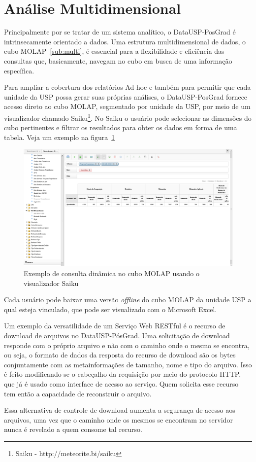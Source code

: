 \section{Análise Multidimensional}
\label{sec:amult}
Principalmente por se tratar de um sistema analítico, o DataUSP-PosGrad é intrinsecamente orientado a dados. Uma estrutura multidimensional de dados, o cubo MOLAP~\ref{sub:multi}, é essencial para a flexibilidade e eficiência das consultas que, basicamente, navegam no cubo em busca de uma informação específica.
\par
Para ampliar a cobertura dos relatórios Ad-hoc e também para permitir que cada unidade da USP possa gerar suas próprias análises, o DataUSP-PosGrad fornece acesso direto ao cubo MOLAP, segmentado por unidade da USP, por meio de um visualizador chamado Saiku\footnote{Saiku - http://meteorite.bi/saiku}. No Saiku o usuário pode selecionar as dimensões do cubo pertinentes e filtrar os resultados para obter os dados em forma de uma tabela. Veja um exemplo na figura~\ref{fig:saiku}

\begin{figure}[H]
    \includegraphics[width=\textwidth]{figuras/saiku.png}
    \caption{Exemplo de consulta dinâmica no cubo MOLAP usando o visualizador Saiku}
    \label{fig:saiku}
\end{figure}
 
Cada usuário pode baixar uma versão \emph{offline} do cubo MOLAP da unidade USP a qual esteja vinculado, que pode ser visualizado com o Microsoft Excel.
\par
Um exemplo da versatilidade de um Serviço Web RESTful é o recurso de download de arquivos no DataUSP-PósGrad. Uma solicitação de download responde com o próprio arquivo e não com o caminho onde o mesmo se encontra, ou seja, o formato de dados da resposta do recurso de download são os bytes conjuntamente com as metainformações de tamanho, nome e tipo do arquivo. Isso é feito modificando-se o cabeçalho da requisição por meio do protocolo HTTP, que já é usado como interface de acesso ao serviço. Quem solicita esse recurso tem então a capacidade de reconstruir o arquivo.
\par
Essa alternativa de controle de download aumenta a segurança de acesso aos arquivos, uma vez que o caminho onde os mesmos
se encontram no servidor nunca é revelado a quem consome tal recurso.


